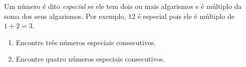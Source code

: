 Um número é dito \emph{especial} se ele tem dois ou mais algarismos e é múltiplo da soma dos seus algarismos. Por exemplo, $12$ é especial pois ele é múltiplo de $1 + 2 = 3$.

\begin{enumerate}[label = (\alph*)]
	\item Encontre três números especiais consecutivos.
	\item Encontre quatro números especiais consecutivos.
\end{enumerate}
